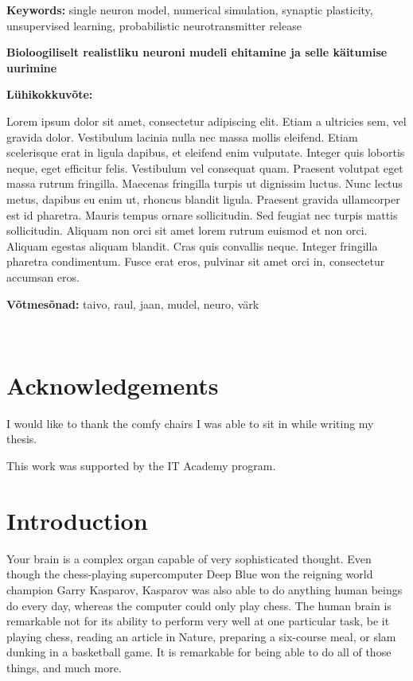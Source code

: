 \documentclass[a4paper,12pt]{report}
\theoremstyle{definition}
\newcommand{\thesistitleEST}{Bioloogiliselt realistliku neuroni mudeli ehitamine ja selle käitumise uurimine}
\begin{document}
\textbf{Keywords:} single neuron model, numerical simulation, synaptic plasticity, unsupervised learning, probabilistic neurotransmitter release

\vspace{1.5cm}



{\textbf
{\Large \thesistitleEST}}

\textbf{Lühikokkuvõte:}

Lorem ipsum dolor sit amet, consectetur adipiscing elit. Etiam a ultricies sem, vel gravida dolor. Vestibulum lacinia nulla nec massa mollis eleifend. Etiam scelerisque erat in ligula dapibus, et eleifend enim vulputate. Integer quis lobortis neque, eget efficitur felis. Vestibulum vel consequat quam. Praesent volutpat eget massa rutrum fringilla. Maecenas fringilla turpis ut dignissim luctus. Nunc lectus metus, dapibus eu enim ut, rhoncus blandit ligula. Praesent gravida ullamcorper est id pharetra. Mauris tempus ornare sollicitudin. Sed feugiat nec turpis mattis sollicitudin. Aliquam non orci sit amet lorem rutrum euismod et non orci. Aliquam egestas aliquam blandit. Cras quis convallis neque. Integer fringilla pharetra condimentum. Fusce erat eros, pulvinar sit amet orci in, consectetur accumsan eros.

\textbf{Võtmesõnad:} taivo, raul, jaan, mudel, neuro, värk


\
\thispagestyle{empty}
\pagebreak

\chapter*{Acknowledgements}

I would like to thank the comfy chairs I was able to sit in while writing my thesis.

This work was supported by the IT Academy program.



\tableofcontents
\newpage




\chapter*{Introduction}


Your brain is a complex organ capable of very sophisticated thought. Even though the chess-playing supercomputer Deep Blue won the reigning world champion Garry Kasparov, Kasparov was also able to do anything human beings do every day, whereas the computer could only play chess. The human brain is remarkable not for its ability to perform very well at one particular task, be it playing chess, reading an article in Nature, preparing a six-course meal, or slam dunking in a basketball game. It is remarkable for being able to do all of those things, and much more.
\end{document}

